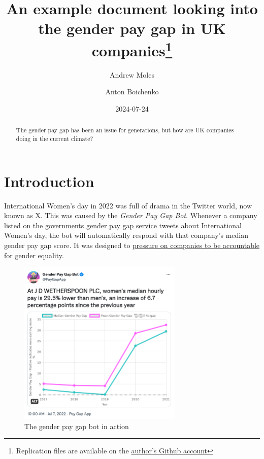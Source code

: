 \documentclass[
  11pt,
  letterpaper,
  DIV=11,
  numbers=noendperiod]{scrartcl}
\title{An example document looking into the gender pay gap in UK
companies\thanks{Replication files are available on the
\href{https://github.com/andrewmoles2/gender_pay_gap_example}{author's
Github account}}}
\author{Andrew Moles \and Anton Boichenko}
\date{2024-07-24}
\begin{document}
\maketitle
\begin{abstract}
The gender pay gap has been an issue for generations, but how are UK
companies doing in the current climate?
\end{abstract}

\newpage

\raggedright
\newpage
\setcounter{tocdepth}{4}
\tableofcontents
\listoffigures
\listoftables

\newpage

\section{Introduction}\label{introduction}

International Women's day in 2022 was full of drama in the Twitter
world, now known as X. This was caused by the \emph{Gender Pay Gap Bot}.
Whenever a company listed on the
\href{https://gender-pay-gap.service.gov.uk/}{governments gender pay gap
service} tweets about International Women's day, the bot will
automatically respond with that company's median gender pay gap score.
It was designed to
\href{https://www.independent.co.uk/tech/people-ryanair-manchester-the-new-york-times-university-b2296194.html}{pressure
on companies to be accountable} for gender equality.

\begin{figure}[H]

{\centering \includegraphics[width=0.7\textwidth,height=\textheight]{pay_gap_bot.png}

}

\caption{The gender pay gap bot in action}

\end{figure}%
\end{document}
